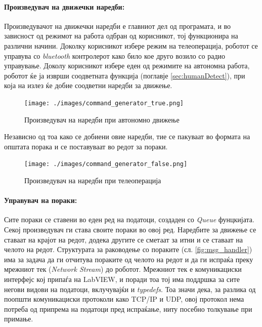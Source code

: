 \documentclass[11pt]{article}
\begin{document}
    \paragraph{Произведувач на движечки наредби:\\}
      Произведувачот на движечки наредби е главниот дел од програмата, и во зависност од режимот на работа одбран од корисникот, тој функционира на различни начини. Доколку корисникот избере режим на телеоперација, роботот се управува со \textit{bluetooth} контролерот како било кое друго возило со радио управување. Доколу корисникот избере еден од режимите на автономна работа, роботот ќе ја изврши соодветната функција (поглавје \ref{sec:humanDetect}), при која на излез ќе добие соодветни наредби за движење.
      \begin{figure}[H]
        \centering
        \texttt{[image: ./images/command\_generator\_true.png]} %
        \caption{Произведувач на наредби при автономно движење}
        \end{figure}
      Независно од тоа како се добиени овие наредби, тие се пакуваат во формата на општата порака и се поставуваат во редот за пораки.
      \begin{figure}[H]
        \centering
        \texttt{[image: ./images/command\_generator\_false.png]}
        \caption{Произведувач на наредби при телеоперација}
        \end{figure}

    \bigbreak

    \paragraph{Управувач на пораки:\\} %
      \label{sec:message_handler}
      Сите пораки се ставени во еден ред на податоци, создаден со \textit{Queue} фунцкијата. Секој произведувач ги става своите пораки во овој ред. Наредбите за движење се ставаат на крајот на редот, додека другите се сметаат за итни и се ставаат на челото на редот. Структурата за раководење со пораките (сл. \ref{fig:msg_handler}) има за задача да ги отчитува пораките од челото на редот и да ги испраќа преку мрежниот тек (\textit{Network Stream}) до роботот. Мрежниот тек е комуникациски интерфејс кој припаѓа на LabVIEW, и поради тоа тој има поддршка за сите негови видови на податоци, вклучувајќи и \textit{typedefs}. Тоа значи дека, за разлика од поопшти комуникациски протоколи како TCP/IP и UDP, овој протокол нема потреба од припрема на податоци пред испраќање, ниту посебно толкување при примање.
\end{document}
